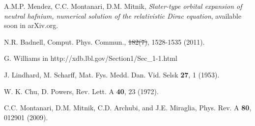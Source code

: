 \documentclass[aps,pra,reprint,groupedaddress,showpacs,showkeys]{revtex4-1} %
\providecommand{\DIFadd}[1]{{\protect\color{blue}\uwave{#1}}} %
\providecommand{\DIFdel}[1]{{\protect\color{red}\sout{#1}}}                      %
\providecommand{\DIFaddbegin}{} %
\providecommand{\DIFaddend}{} %
\providecommand{\DIFdelbegin}{} %
\providecommand{\DIFdelend}{} %
\newcommand{\DIFscaledelfig}{0.5}
\newlength{\DIFdelgraphicswidth} %
\newlength{\DIFdelgraphicsheight} %
\newcommand{\DIFaddincludegraphics}[2][]{{\color{blue}\fbox{\DIFOincludegraphics[#1]{#2}}}} %
\newcommand{\DIFdelincludegraphics}[2][]{%
\sbox{\DIFdelgraphicsbox}{\DIFOincludegraphics[#1]{#2}}%
\settoboxwidth{\DIFdelgraphicswidth}{\DIFdelgraphicsbox} %
\settoboxtotalheight{\DIFdelgraphicsheight}{\DIFdelgraphicsbox} %
\scalebox{\DIFscaledelfig}{%
\parbox[b]{\DIFdelgraphicswidth}{\usebox{\DIFdelgraphicsbox}\\[-\baselineskip] \rule{\DIFdelgraphicswidth}{0em}}\llap{\resizebox{\DIFdelgraphicswidth}{\DIFdelgraphicsheight}{%
\setlength{\unitlength}{\DIFdelgraphicswidth}%
\begin{picture}(1,1)%
\thicklines\linethickness{2pt} %
{\color[rgb]{1,0,0}\put(0,0){\framebox(1,1){}}}%
{\color[rgb]{1,0,0}\put(0,0){\line( 1,1){1}}}%
{\color[rgb]{1,0,0}\put(0,1){\line(1,-1){1}}}%
\end{picture}%
}\hspace*{3pt}}} %
} %
\DeclareRobustCommand{\DIFaddbegin}{\DIFOaddbegin \let\includegraphics\DIFaddincludegraphics} %
\DeclareRobustCommand{\DIFaddend}{\DIFOaddend \let\includegraphics\DIFOincludegraphics} %
\DeclareRobustCommand{\DIFdelbegin}{\DIFOdelbegin \let\includegraphics\DIFdelincludegraphics} %
\DeclareRobustCommand{\DIFdelend}{\DIFOaddend \let\includegraphics\DIFOincludegraphics} %
\begin{document}
\begin{thebibliography}{00}
\DIFaddend {} 
A.M.P. Mendez, C.C. Montanari, D.M. Mitnik, 
\textit{Slater-type orbital expansion of neutral hafnium, numerical 
solution of the relativistic Dirac equation}, 
available soon in arXiv.org. 
\DIFaddbegin 

\DIFaddend {} 
N.R. Badnell, 
Comput. Phys. Commun., \DIFdelbegin \DIFdel{182(7)}\DIFdelend \DIFaddbegin \textbf{\DIFadd{182}}\DIFaddend , 1528-1535 (2011).
\DIFaddbegin 

\DIFaddend {} 
G. Williams in http://xdb.lbl.gov/Section1/Sec\_1-1.html
\DIFaddbegin 

\DIFaddend {} 
J. Lindhard, M. Scharff,  
Mat. Fys. Medd. Dan. Vid. Selsk  \textbf{27}, 1 (1953).
\DIFaddbegin 

\DIFaddend {} 
W. K. Chu, D. Powers, 
Rev. Lett. A \textbf{40}, 23 (1972).
\DIFaddbegin 

\DIFaddend {} 
C.C. Montanari, D.M. Mitnik, C.D. Archubi, and J.E. Miraglia, 
Phys. Rev. A \textbf{80}, 012901 (2009).
\DIFaddbegin 

\DIFaddend \end{thebibliography}
\end{document}
